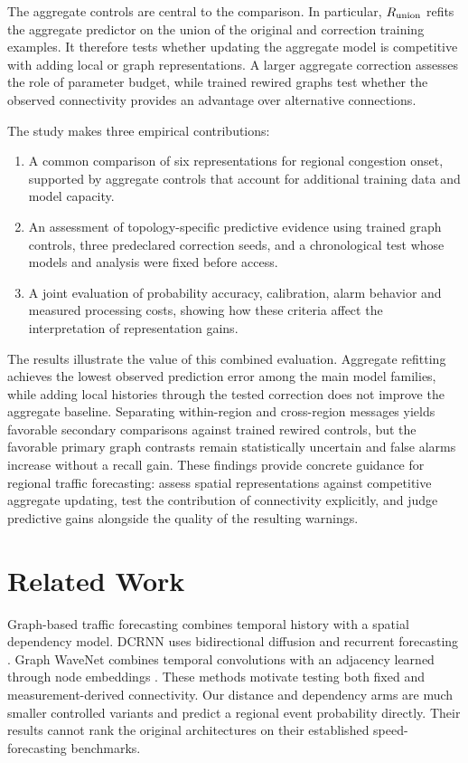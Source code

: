 \documentclass{llncs}
\begin{document}
The aggregate controls are central to the comparison. In particular, $R_{\rm union}$ refits the aggregate predictor on the union of the original and correction training examples. It therefore tests whether updating the aggregate model is competitive with adding local or graph representations. A larger aggregate correction assesses the role of parameter budget, while trained rewired graphs test whether the observed connectivity provides an advantage over alternative connections.

The study makes three empirical contributions:
\begin{enumerate}
    \item A common comparison of six representations for regional congestion onset, supported by aggregate controls that account for additional training data and model capacity.
    \item An assessment of topology-specific predictive evidence using trained graph controls, three predeclared correction seeds, and a chronological test whose models and analysis were fixed before access.
    \item A joint evaluation of probability accuracy, calibration, alarm behavior and measured processing costs, showing how these criteria affect the interpretation of representation gains.
\end{enumerate}

The results illustrate the value of this combined evaluation. Aggregate refitting achieves the lowest observed prediction error among the main model families, while adding local histories through the tested correction does not improve the aggregate baseline. Separating within-region and cross-region messages yields favorable secondary comparisons against trained rewired controls, but the favorable primary graph contrasts remain statistically uncertain and false alarms increase without a recall gain. These findings provide concrete guidance for regional traffic forecasting: assess spatial representations against competitive aggregate updating, test the contribution of connectivity explicitly, and judge predictive gains alongside the quality of the resulting warnings.









\section{Related Work}
Graph-based traffic forecasting combines temporal history with a spatial dependency model. DCRNN uses bidirectional diffusion and recurrent forecasting \cite{dcrnn}. Graph WaveNet combines temporal convolutions with an adjacency learned through node embeddings \cite{gwnet}. These methods motivate testing both fixed and measurement-derived connectivity. Our distance and dependency arms are much smaller controlled variants and predict a regional event probability directly. Their results cannot rank the original architectures on their established speed-forecasting benchmarks.
\end{document}
